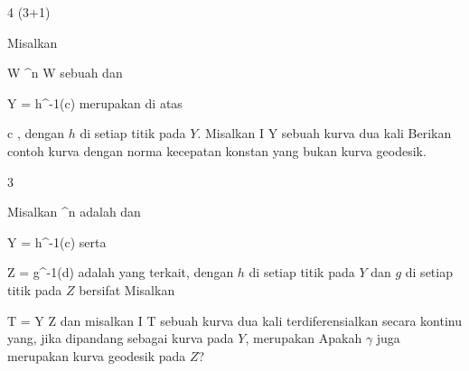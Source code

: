 {4 (3+1)}
{

Misalkan

\mavergleichskette
{\vergleichskette
{ W
}
{ \subseteq }{ \R^n
}
{  }{
}
{    }{
}
{   }{
}
}
{}{}{}
 { W } { \R
} {}
sebuah
dan

\mavergleichskette
{\vergleichskette
{ Y
}
{ = }{ h^{-1}(c)
}
{  }{
}
{    }{
}
{   }{
}
}
{}{}{}
merupakan
di atas

\mavergleichskette
{\vergleichskette
{ c
}
{ \in }{ \R
}
{  }{
}
{    }{
}
{   }{
}
}
{}{}{,}
dengan $h$
di setiap titik pada $Y$. Misalkan
\maabbdisp {\gamma} { I } { Y
} {}
sebuah kurva dua kali
 {Berikan contoh kurva dengan norma kecepatan konstan yang bukan kurva geodesik.
}

}
{} {}

{3}
{

Misalkan
 {\R^n } { \R
} {}
adalah
dan

\mavergleichskette
{\vergleichskette
{ Y
}
{ = }{ h^{-1}(c)
}
{  }{
}
{    }{
}
{   }{
}
}
{}{}{}
serta

\mavergleichskette
{\vergleichskette
{ Z
}
{ = }{ g^{-1}(d)
}
{  }{
}
{    }{
}
{   }{
}
}
{}{}{}
adalah
yang terkait, dengan $h$ di setiap titik pada $Y$ dan $g$ di setiap titik pada $Z$ bersifat
Misalkan

\mavergleichskette
{\vergleichskette
{ T
}
{ = }{ Y \cap Z
}
{  }{
}
{    }{
}
{   }{
}
}
{}{}{}
dan misalkan
\maabbdisp {\gamma} { I } { T
} {}
sebuah kurva dua kali terdiferensialkan secara kontinu yang, jika dipandang sebagai kurva pada $Y$, merupakan
Apakah $\gamma$ juga merupakan kurva geodesik pada $Z$?

}
{} {}
